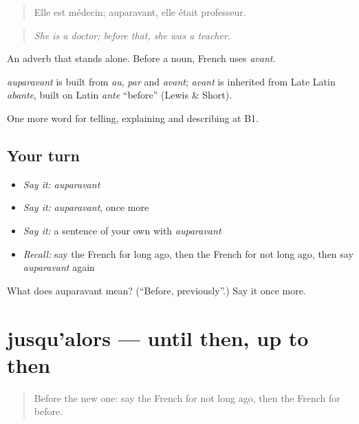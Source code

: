 \begin{quote}
Elle est médecin; auparavant, elle était professeur.
\end{quote}

\begin{quote}
\emph{She is a doctor; before that, she was a teacher.}
\end{quote}

An adverb that stands alone. Before a noun, French uses \emph{avant}.

\begin{cousinweb}
\emph{auparavant} is built from \emph{au}, \emph{par} and \emph{avant}; \emph{avant} is inherited from Late Latin \emph{abante}, built on Latin \emph{ante} \textquotedblleft{}before\textquotedblright{} (Lewis \& Short).
\end{cousinweb}

\begin{grammarlens}[title={What you've built}]
One more word for telling, explaining and describing at B1.
\end{grammarlens}

\subsection*{Your turn}
\begin{itemize}
\raggedright
  \item \emph{Say it:} \emph{auparavant}
  \item \emph{Say it:} \emph{auparavant}, once more
  \item \emph{Say it:} a sentence of your own with \emph{auparavant}
  \item \emph{Recall:} say the French for long ago, then the French for not long ago, then say \emph{auparavant} again
\end{itemize}

\begin{tcolorbox}[breakable,colback=teal!4,colframe=teal!35!black,title={Before you move on}]
What does auparavant mean? (\textquotedblleft{}Before, previously\textquotedblright{}.) Say it once more.
\end{tcolorbox}
\section[jusqu'alors]{jusqu'alors — until then, up to then}

\label{lesson:FR-C272-jusqu-alors}



\begin{quote}
Before the new one: say the French for not long ago, then the French for before.
\end{quote}

